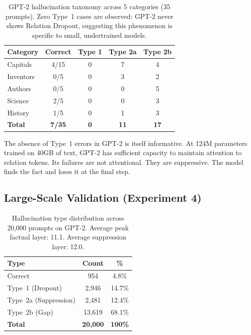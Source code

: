 \documentclass[11pt,a4paper]{article}
\begin{document}
\begin{table}[H]
\centering
\caption{GPT-2 hallucination taxonomy across 5 categories
(35 prompts). Zero Type~1 cases are observed: GPT-2 never
shows Relation Dropout, suggesting this phenomenon is
specific to small, undertrained models.}
\label{tab:gpt2}
\begin{tabular}{lcccc}
\toprule
\textbf{Category} & \textbf{Correct} &
\textbf{Type 1} & \textbf{Type 2a} & \textbf{Type 2b} \\
\midrule
Capitals   & 4/15 & 0 & 7  & 4 \\
Inventors  & 0/5  & 0 & 3  & 2 \\
Authors    & 0/5  & 0 & 0  & 5 \\
Science    & 2/5  & 0 & 0  & 3 \\
History    & 1/5  & 0 & 1  & 3 \\
\midrule
\textbf{Total} & \textbf{7/35} & \textbf{0} &
\textbf{11} & \textbf{17} \\
\bottomrule
\end{tabular}
\end{table}

The absence of Type~1 errors in GPT-2 is itself informative.
At 124M parameters trained on 40GB of text, GPT-2 has
sufficient capacity to maintain attention to relation tokens.
Its failures are not attentional. They are suppressive.
The model finds the fact and loses it at the final step.

\subsection{Large-Scale Validation (Experiment 4)}

\begin{table}[H]
\centering
\caption{Hallucination type distribution across 20,000
prompts on GPT-2. Average peak factual layer: 11.1.
Average suppression layer: 12.0.}
\label{tab:largescale}
\begin{tabular}{lcc}
\toprule
\textbf{Type} & \textbf{Count} & \textbf{\%} \\
\midrule
Correct                 &    954 &  4.8\% \\
Type~1 (Dropout)        &  2,946 & 14.7\% \\
Type~2a (Suppression)   &  2,481 & 12.4\% \\
Type~2b (Gap)           & 13,619 & 68.1\% \\
\midrule
\textbf{Total}          & \textbf{20,000} & \textbf{100\%} \\
\bottomrule
\end{tabular}
\end{table}
\end{document}
